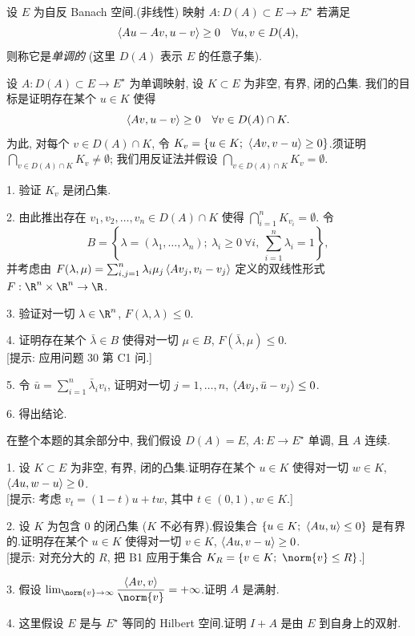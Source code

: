 \begin{problem}[第 3, 5 章]
\label{prob:31}
设 $E$ 为自反 Banach 空间.(非线性) 映射 $A:D(A)\subset E\to E^\star$ 若满足
\begin{equation*}
\left\langle Au-Av,u-v\right\rangle\ge0\quad\forall u,v\in D(A),
\end{equation*}
则称它是\emph{单调的} (这里 $D(A)$ 表示 $E$ 的任意子集).


设 $A:D(A)\subset E\to E^\star$ 为单调映射, 设 $K\subset E$ 为非空, 有界, 闭的凸集.
我们的目标是证明存在某个 $u\in K$ 使得
\begin{equation*}
\left\langle Av,u-v\right\rangle\ge0\quad\forall v\in D(A)\cap K.
\end{equation*}
为此, 对每个 $v\in D(A)\cap K$, 令 $K_v=\{u\in K;\ \dual{Av}{v-u}\ge0\}$.须证明
$\bigcap_{v\in D(A)\cap K}K_v\ne\emptyset$; 我们用反证法并假设
$\bigcap_{v\in D(A)\cap K}K_v=\emptyset$.

1. 验证 $K_v$ 是闭凸集.

2. 由此推出存在 $v_1,v_2,\dots,v_n\in D(A)\cap K$ 使得 $\bigcap_{i=1}^nK_{v_i}=\emptyset$.
令
\begin{equation*}
B=\left\{\lambda=(\lambda_1,\dots,\lambda_n);\ \lambda_i\ge0\ \forall i,\ \sum_{i=1}^n\lambda_i=1\right\},
\end{equation*}
并考虑由 $F(\lambda,\mu)=\sum_{i,j=1}^n\lambda_i\mu_j\left\langle Av_j,v_i-v_j\right\rangle$ 定义的双线性形式
$F:\R^n\times\R^n\to\R$.

3. 验证对一切 $\lambda\in\R^n$, $F(\lambda,\lambda)\le0$.

4. 证明存在某个 $\bar\lambda\in B$ 使得对一切 $\mu\in B$, $F(\bar\lambda,\mu)\le0$.\\
{[提示: 应用问题 30 第 C1 问.]}

5. 令 $\bar u=\sum_{i=1}^n\bar\lambda_iv_i$, 证明对一切 $j=1,\dots,n$,
$\left\langle Av_j,\bar u-v_j\right\rangle\le0$.

6. 得出结论.


在整个本题的其余部分中, 我们假设 $D(A)=E$, $A:E\to E^\star$ 单调, 且 $A$ 连续.

1. 设 $K\subset E$ 为非空, 有界, 闭的凸集.证明存在某个 $u\in K$ 使得对一切
$w\in K$, $\left\langle Au,w-u\right\rangle\ge0$.\\
{[提示: 考虑 $v_t=(1-t)u+tw$, 其中 $t\in(0,1),w\in K$.]}

2. 设 $K$ 为包含 $0$ 的闭凸集 ($K$ 不必有界).假设集合 $\{u\in K;\ \dual{Au}{u}\le0\}$
是有界的.证明存在某个 $u\in K$ 使得对一切 $v\in K$, $\left\langle Au,v-u\right\rangle\ge0$.\\
{[提示: 对充分大的 $R$, 把 B1 应用于集合 $K_R=\{v\in K;\ \norm{v}\le R\}$.]}

3. 假设 $\lim_{\norm{v}\to\infty}\dfrac{\dual{Av}{v}}{\norm{v}}=+\infty$.证明 $A$ 是满射.

4. 这里假设 $E$ 是与 $E^\star$ 等同的 Hilbert 空间.证明 $I+A$ 是由 $E$ 到自身上的双射.
\end{problem}

